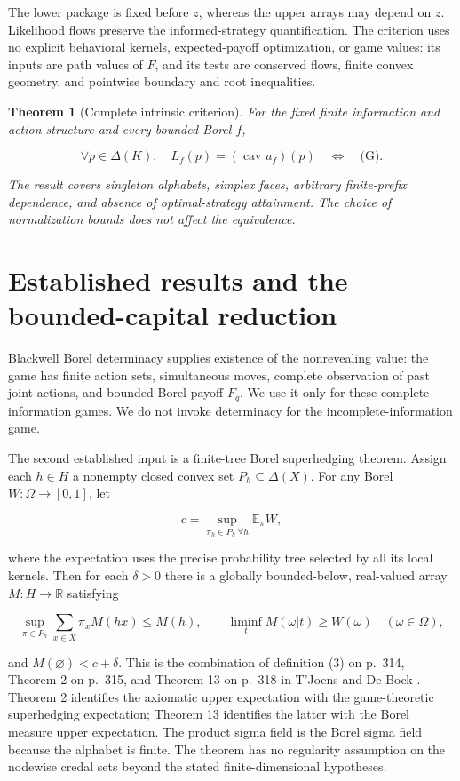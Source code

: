 \documentclass[11pt,a4paper]{article}
\newtheorem{theorem}{Theorem}
\begin{document}
The lower package is fixed before \(z\), whereas the upper arrays may depend
on \(z\). Likelihood flows preserve the informed-strategy quantification.
The criterion uses no explicit behavioral kernels, expected-payoff
optimization, or game values: its inputs are path values of \(F\), and its
tests are conserved flows, finite convex geometry, and pointwise boundary
and root inequalities.

\begin{theorem}[Complete intrinsic criterion]\label{thm:main}
For the fixed finite information and action structure and every bounded Borel \(f\),

\[
\forall p\in\Delta(K),\quad L_f(p)=(\operatorname{cav}u_f)(p)
\quad\Longleftrightarrow\quad \text{(G)}.
\]

The result covers singleton alphabets, simplex faces, arbitrary finite-prefix dependence, and absence of optimal-strategy attainment. The choice of normalization bounds does not affect the equivalence.
\end{theorem}

\section{Established results and the bounded-capital reduction}

Blackwell Borel determinacy \cite[Theorem 10, p.~1578]{Martin} supplies existence of the nonrevealing value: the game has finite action sets, simultaneous moves, complete observation of past joint actions, and bounded Borel payoff \(F_q\). We use it only for these complete-information games. We do not invoke determinacy for the incomplete-information game.

The second established input is a finite-tree Borel superhedging theorem. Assign each \(h\in H\) a nonempty closed convex set \(P_h\subseteq\Delta(X)\). For any Borel \(W:\Omega\to[0,1]\), let

\[
c=\sup_{\pi_h\in P_h\ \forall h}\mathbb E_\pi W,
\]

where the expectation uses the precise probability tree selected by all its local kernels. Then for each \(\delta>0\) there is a globally bounded-below, real-valued array \(M:H\to\mathbb R\) satisfying

\[
\sup_{\pi\in P_h}\sum_{x\in X}\pi_x M(hx)\le M(h),\qquad
\liminf_tM(\omega|t)\ge W(\omega)\quad(\omega\in\Omega),
\]

and \(M(\varnothing)<c+\delta\). This is the combination of definition (3) on p.~314, Theorem 2 on p.~315, and Theorem 13 on p.~318 in T'Joens and De Bock \cite{TDB}. Theorem 2 identifies the axiomatic upper expectation with the game-theoretic superhedging expectation; Theorem 13 identifies the latter with the Borel measure upper expectation. The product sigma field is the Borel sigma field because the alphabet is finite. The theorem has no regularity assumption on the nodewise credal sets beyond the stated finite-dimensional hypotheses.
\end{document}

